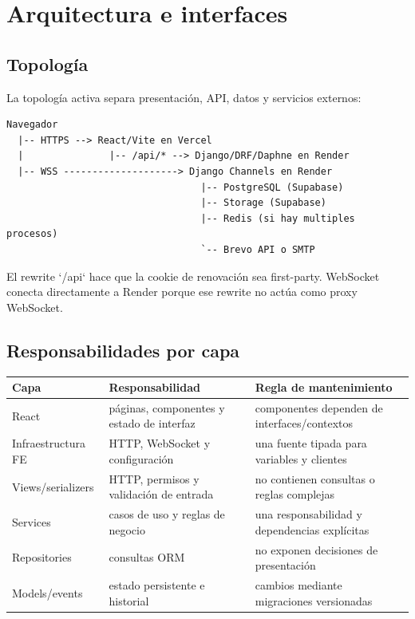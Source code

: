 \chapter{Arquitectura e interfaces}

\section{Topología}

La topología activa separa presentación, API, datos y servicios externos:

\begin{lstlisting}
Navegador
  |-- HTTPS --> React/Vite en Vercel
  |               |-- /api/* --> Django/DRF/Daphne en Render
  |-- WSS --------------------> Django Channels en Render
                                  |-- PostgreSQL (Supabase)
                                  |-- Storage (Supabase)
                                  |-- Redis (si hay multiples procesos)
                                  `-- Brevo API o SMTP
\end{lstlisting}

El rewrite `/api` hace que la cookie de renovación sea first-party. WebSocket conecta directamente
a Render porque ese rewrite no actúa como proxy WebSocket.

\section{Responsabilidades por capa}

\begin{tabularx}{\textwidth}{@{}L{0.2\textwidth}Y Y@{}}
\toprule
\textbf{Capa} & \textbf{Responsabilidad} & \textbf{Regla de mantenimiento}\\
\midrule
React & páginas, componentes y estado de interfaz & componentes dependen de interfaces/contextos\\
Infraestructura FE & HTTP, WebSocket y configuración & una fuente tipada para variables y clientes\\
Views/serializers & HTTP, permisos y validación de entrada & no contienen consultas o reglas complejas\\
Services & casos de uso y reglas de negocio & una responsabilidad y dependencias explícitas\\
Repositories & consultas ORM & no exponen decisiones de presentación\\
Models/events & estado persistente e historial & cambios mediante migraciones versionadas\\
\bottomrule
\end{tabularx}

